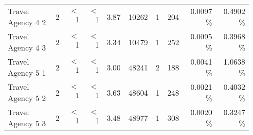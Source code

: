 \begin{tabular}{|l|r|rrr|rrr|rr|}
  Travel Agency 4 2 &   2 & $<$1 & $<$1 & 3.87 & 10262 &   1 & 204 &  0.0097 \% &    0.4902 \% \\ 
  Travel Agency 4 3 &   2 & $<$1 & $<$1 & 3.34 & 10479 &   1 & 252 &  0.0095 \% &    0.3968 \% \\ 
  Travel Agency 5 1 &   2 & $<$1 & $<$1 & 3.00 & 48241 &   2 & 188 &  0.0041 \% &    1.0638 \% \\ 
  Travel Agency 5 2 &   2 & $<$1 & $<$1 & 3.63 & 48604 &   1 & 248 &  0.0021 \% &    0.4032 \% \\ 
  Travel Agency 5 3 &   2 & $<$1 & $<$1 & 3.48 & 48977 &   1 & 308 &  0.0020 \% &    0.3247 \% \\ 
   \hline
\end{tabular}
